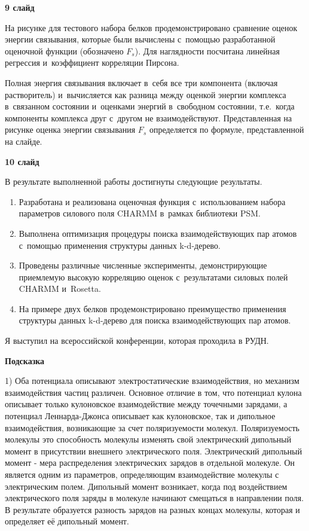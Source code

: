 \documentclass[17pt]{extarticle}
\begin{document}
\textbf{9 слайд}

На рисунке для тестового набора белков продемонстрировано сравнение оценок энергии связывания, которые были вычислены с~помощью разработанной оценочной функции (обозначено $F_s$). Для наглядности посчитана линейная регрессия и~коэффициент корреляции Пирсона.

Полная энергия связывания включает в~себя все три компонента (включая растворитель) и~вычисляется как разница между оценкой энергии комплекса в~связанном состоянии и~оценками энергий в~свободном состоянии, т.е.~когда компоненты комплекса друг с~другом не взаимодействуют. Представленная на рисунке оценка энергии связывания $F_s$ определяется по формуле, представленной на слайде.

\vspace{+5mm}


\textbf{10 слайд}

В результате выполненной работы достигнуты следующие результаты.

\begin{enumerate}
	\item Разработана и реализована оценочная функция с~использованием набора параметров силового поля CHARMM в~рамках библиотеки PSM.
	\item Выполнена оптимизация процедуры поиска взаимодействующих пар атомов с~помощью применения структуры данных k-d-дерево.
	\item Проведены различные численные эксперименты, демонстрирующие приемлемую высокую корреляцию оценок с~результатами силовых полей CHARMM и~Rosetta.
	\item На примере двух белков продемонстрировано преимущество применения структуры данных k-d-дерево для поиска взаимодействующих пар атомов.
\end{enumerate}

Я выступил на всероссийской конференции, которая проходила в РУДН.


\vspace{+5mm}


\textbf{Подсказка}

1) Оба потенциала описывают электростатические взаимодействия, но механизм взаимодействия частиц различен. Основное отличие в том, что потенциал кулона описывает только кулоновское взаимодействие между точечными зарядами, а потенциал Леннарда-Джонса описывает как кулоновское, так и дипольное взаимодействия, возникающие за счет поляризуемости молекул. Поляризуемость молекулы это способность молекулы изменять свой электрический дипольный момент в присутствии внешнего электрического поля. Электрический дипольный момент - мера распределения электрических зарядов в отдельной молекуле. Он является одним из параметров, определяющим взаимодействие молекулы с электрическим полем. Дипольный момент возникает, когда под воздействием электрического поля заряды в молекуле начинают смещаться в направлении поля. В результате образуется разность зарядов на разных концах молекулы, которая и определяет её дипольный момент. 
\end{document}
